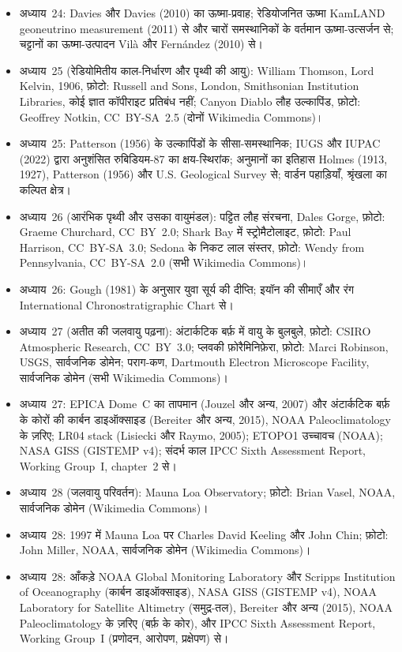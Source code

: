 \begin{itemize}
  \item अध्याय~24: Davies और Davies (2010) का ऊष्मा-प्रवाह; रेडियोजनित ऊष्मा KamLAND geoneutrino measurement (2011) से और चारों समस्थानिकों के वर्तमान ऊष्मा-उत्सर्जन से; चट्टानों का ऊष्मा-उत्पादन Vilà और Fernández (2010) से।
  \item अध्याय~25 (रेडियोमितीय काल-निर्धारण और पृथ्वी की आयु): William Thomson, Lord Kelvin, 1906, फ़ोटो: Russell and Sons, London, Smithsonian Institution Libraries, कोई ज्ञात कॉपीराइट प्रतिबंध नहीं; Canyon Diablo लौह उल्कापिंड, फ़ोटो: Geoffrey Notkin, CC~BY-SA~2.5 (दोनों Wikimedia Commons)।
  \item अध्याय~25: Patterson (1956) के उल्कापिंडों के सीसा-समस्थानिक; IUGS और IUPAC (2022) द्वारा अनुशंसित रुबिडियम-87 का क्षय-स्थिरांक; अनुमानों का इतिहास Holmes (1913, 1927), Patterson (1956) और U.S. Geological Survey से; वार्डन पहाड़ियाँ, श्रृंखला का कल्पित क्षेत्र।
  \item अध्याय~26 (आरंभिक पृथ्वी और उसका वायुमंडल): पट्टित लौह संरचना, Dales Gorge, फ़ोटो: Graeme Churchard, CC~BY~2.0; Shark Bay में स्ट्रोमैटोलाइट, फ़ोटो: Paul Harrison, CC~BY-SA~3.0; Sedona के निकट लाल संस्तर, फ़ोटो: Wendy from Pennsylvania, CC~BY-SA~2.0 (सभी Wikimedia Commons)।
  \item अध्याय~26: Gough (1981) के अनुसार युवा सूर्य की दीप्ति; इयॉन की सीमाएँ और रंग International Chronostratigraphic Chart से।
  \item अध्याय~27 (अतीत की जलवायु पढ़ना): अंटार्कटिक बर्फ़ में वायु के बुलबुले, फ़ोटो: CSIRO Atmospheric Research, CC~BY~3.0; प्लवकी फ़ोरैमिनिफ़ेरा, फ़ोटो: Marci Robinson, USGS, सार्वजनिक डोमेन; पराग-कण, Dartmouth Electron Microscope Facility, सार्वजनिक डोमेन (सभी Wikimedia Commons)।
  \item अध्याय~27: EPICA Dome~C का तापमान (Jouzel और अन्य, 2007) और अंटार्कटिक बर्फ़ के कोरों की कार्बन डाइऑक्साइड (Bereiter और अन्य, 2015), NOAA Paleoclimatology के ज़रिए; LR04 stack (Lisiecki और Raymo, 2005); ETOPO1 उच्चावच (NOAA); NASA GISS (GISTEMP v4); संदर्भ काल IPCC Sixth Assessment Report, Working Group~I, chapter~2 से।
  \item अध्याय~28 (जलवायु परिवर्तन): Mauna Loa Observatory; फ़ोटो: Brian Vasel, NOAA, सार्वजनिक डोमेन (Wikimedia Commons)।
  \item अध्याय~28: 1997 में Mauna Loa पर Charles David Keeling और John Chin; फ़ोटो: John Miller, NOAA, सार्वजनिक डोमेन (Wikimedia Commons)।
  \item अध्याय~28: आँकड़े NOAA Global Monitoring Laboratory और Scripps Institution of Oceanography (कार्बन डाइऑक्साइड), NASA GISS (GISTEMP v4), NOAA Laboratory for Satellite Altimetry (समुद्र-तल), Bereiter और अन्य (2015), NOAA Paleoclimatology के ज़रिए (बर्फ़ के कोर), और IPCC Sixth Assessment Report, Working Group~I (प्रणोदन, आरोपण, प्रक्षेपण) से।
\end{itemize}

